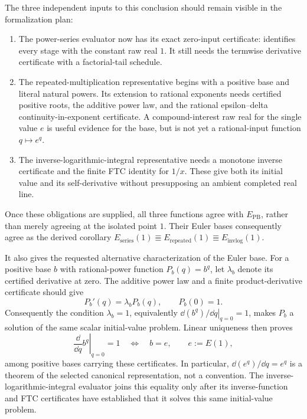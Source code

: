 \begin{theorem}
The three independent inputs to this conclusion should remain visible in the
formalization plan:
\begin{enumerate}
  \item The power-series evaluator now has its exact zero-input certificate:
   identifies every stage
  with the constant raw real \(1\).  It still needs the termwise derivative
  certificate with a factorial-tail schedule.
  \item The repeated-multiplication representative begins with a positive
  base and literal natural powers.  Its extension to rational exponents needs
  certified positive roots, the additive power law, and the rational
  epsilon--delta continuity-in-exponent certificate.  A compound-interest
  raw real for the single value \(e\) is useful evidence for the base, but is
  not yet a rational-input function \(q\mapsto e^q\).
  \item The inverse-logarithmic-integral representative needs a monotone
  inverse certificate and the finite FTC identity for \(1/x\).  These give
  both its initial value and its self-derivative without presupposing an
  ambient completed real line.
\end{enumerate}
Once these obligations are supplied, all three functions agree with
\(E_{\mathrm{PB}}\), rather than merely agreeing at the isolated point
\(1\).  Their Euler bases consequently agree as the derived corollary
\(E_{\mathrm{series}}(1)\Equiv E_{\mathrm{repeated}}(1)\Equiv
E_{\mathrm{invlog}}(1)\).

It also gives the requested alternative characterization of the Euler base.
For a positive base \(b\) with rational-power function \(P_b(q)=b^q\), let
\(\lambda_b\) denote its certified derivative at zero.  The additive power
law and a finite product-derivative certificate should give
\[
  P_b'(q)=\lambda_b P_b(q),\qquad P_b(0)=1.
\]
Consequently the condition \(\lambda_b=1\), equivalently
\(\left.\dd(b^q)/\dd q\right|_{q=0}=1\), makes \(P_b\) a solution of the
same scalar initial-value problem.  Linear uniqueness then proves
\[
 \left.\frac{\dd}{\dd q}b^q\right|_{q=0}=1
 \quad\Longleftrightarrow\quad b=e,
 \qquad e:=E(1),
\]
among positive bases carrying these certificates.  In particular,
\(\dd(e^q)/\dd q=e^q\) is a theorem of the selected canonical
representation, not a convention.  The inverse-logarithmic-integral
evaluator joins this equality only after its inverse-function and FTC
certificates have established that it solves this same initial-value problem.


\end{theorem}
